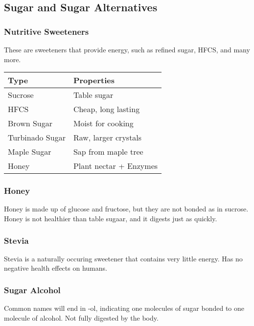 \documentclass[letterpaper, 11pt]{article}
\begin{document}
\subsection{Sugar and Sugar Alternatives}
\label{sec:orgbd76c09}
\subsubsection{Nutritive Sweeteners}
\label{sec:org007ad20}
These are sweeteners that provide energy, such as refined sugar, HFCS, and many more.\\
\begin{center}
\begin{tabular}{ll}
Type & Properties\\
\hline
Sucrose & Table sugar\\
HFCS & Cheap, long lasting\\
Brown Sugar & Moist for cooking\\
Turbinado Sugar & Raw, larger crystals\\
Maple Sugar & Sap from maple tree\\
Honey & Plant nectar + Enzymes\\
\end{tabular}
\end{center}
\subsubsection{Honey}
\label{sec:orgc3dfb68}
Honey is made up of glucose and fructose, but they are not bonded as in sucrose. Honey is not healthier than table sugaar, and it digests just as quickly.\\
\subsubsection{Stevia}
\label{sec:org76e3343}
Stevia is a naturally occuring sweetener that contains very little energy. Has no negative health effects on humans.\\
\subsubsection{Sugar Alcohol}
\label{sec:org5bdd552}
Common names will end in -ol, indicating one molecules of sugar bonded to one molecule of alcohol. Not fully digested by the body.\\
\end{document}
